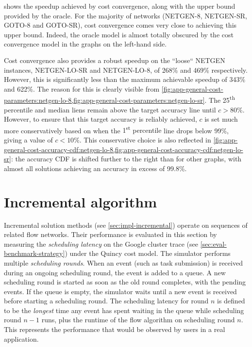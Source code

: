  shows the speedup achieved by cost convergence, along with the upper bound provided by the oracle. For the majority of networks (NETGEN-8, NETGEN-SR, GOTO-8 and GOTO-SR), cost convergence comes very close to achieving this upper bound. Indeed, the oracle model is almost totally obscured by the cost convergence model in the graphs on the left-hand side.

Cost convergence also provides a robust speedup on the ``loose`` NETGEN instances, NETGEN-LO-SR and NETGEN-LO-8, of 268\% and 469\% respectively. However, this is significantly less than the maximum achievable speedup of 343\% and 622\%. The reason for this is clearly visible from \cref{fig:app-general-cost-parameters:netgen-lo-8,fig:app-general-cost-parameters:netgen-lo-sr}. The 25\textsuperscript{th} percentile and {\color{matplotlib_cyan} median} liens remain above the target accuracy line until $c > 80\%$. However, to ensure that this target accuracy is reliably achieved, $c$ is set much more conservatively based on when the {\color{matplotlib_blue} 1\textsuperscript{st} percentile} line drops below 99\%, giving a value of $c < 10\%$. This conservative choice is also reflected in \cref{fig:app-general-cost-accuracy-cdf:netgen-lo-8,fig:app-general-cost-accuracy-cdf:netgen-lo-sr}: the accuracy CDF is shifted further to the right than for other graphs, with almost all solutions achieving an accuracy in excess of 99.8\%.

\section{Incremental algorithm} \label{sec:eval-incremental}

Incremental solution methods (see \cref{sec:impl-incremental}) operate on sequences of related flow networks. Their performance is evaluated in this section by measuring the \emph{scheduling latency} on the Google cluster trace (see \cref{sec:eval-benchmark-strategy}) under the Quincy cost model. The simulator performs multiple \emph{scheduling rounds}. When an event (such as task submission) is received during an ongoing scheduling round, the event is added to a queue. A new scheduling round is started as soon as the old round completes, with the pending events. If the queue is empty, the simulator waits until a new event is received before starting a scheduling round. The scheduling latency for round $n$ is defined to be the \emph{longest} time any event has spent waiting in the queue while scheduling round $n-1$ runs, plus the runtime of the flow algorithm on scheduling round $n$. This represents the performance that would be observed by users in a real application.

